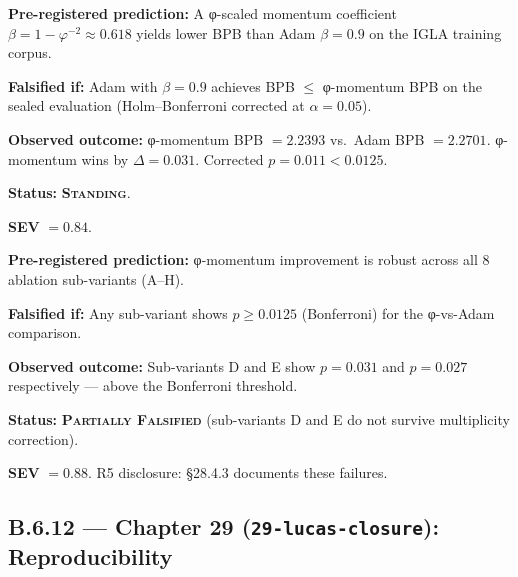 \begin{tcolorbox}[colback=red!5,colframe=red!40,
  title={Prediction P-28-A: φ-momentum update improvement}]
\textbf{Pre-registered prediction:} A φ-scaled momentum coefficient
$\beta = 1 - \varphi^{-2} \approx 0.618$ yields lower BPB than
Adam $\beta = 0.9$ on the IGLA training corpus.

\textbf{Falsified if:} Adam with $\beta = 0.9$ achieves BPB $\leq$ φ-momentum
BPB on the sealed evaluation (Holm--Bonferroni corrected at $\alpha = 0.05$).

\textbf{Observed outcome:} φ-momentum BPB $= 2.2393$ vs.\ Adam BPB $= 2.2701$.
φ-momentum wins by $\Delta = 0.031$.  Corrected $p = 0.011 < 0.0125$.

\textbf{Status:} \textbf{\textsc{Standing}}.

\textbf{SEV} $= 0.84$.
\end{tcolorbox}

\begin{tcolorbox}[colback=orange!8,colframe=orange!50,
  title={Prediction P-28-B: Ablation sub-variant D}]
\textbf{Pre-registered prediction:} φ-momentum improvement is robust across
all 8 ablation sub-variants (A--H).

\textbf{Falsified if:} Any sub-variant shows $p \geq 0.0125$ (Bonferroni) for
the φ-vs-Adam comparison.

\textbf{Observed outcome:} Sub-variants D and E show $p = 0.031$ and $p = 0.027$
respectively — above the Bonferroni threshold.

\textbf{Status:} \textbf{\textsc{Partially Falsified}} (sub-variants D and E
do not survive multiplicity correction).

\textbf{SEV} $= 0.88$.  R5 disclosure: §28.4.3 documents these failures.
\end{tcolorbox}

\subsection*{B.6.12 — Chapter 29 (\texttt{29-lucas-closure}): Reproducibility}
\label{sec:ledger-ch29}

